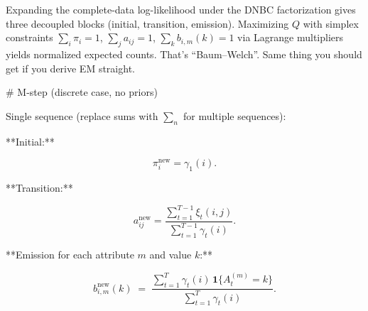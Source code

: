 Expanding the complete-data log-likelihood under the DNBC factorization gives three decoupled blocks (initial, transition, emission). Maximizing $Q$ with simplex constraints $\sum_i \pi_i=1$, $\sum_j a_{ij}=1$, $\sum_k b_{i,m}(k)=1$ via Lagrange multipliers yields normalized expected counts. That’s “Baum–Welch”. Same thing you should get if you derive EM straight.

# M-step (discrete case, no priors)

Single sequence (replace sums with $\sum_n$ for multiple sequences):

**Initial:**

$$
\pi_i^{\text{new}} = \gamma_1(i).
$$

**Transition:**

$$
a_{ij}^{\text{new}} = \frac{\sum_{t=1}^{T-1} \xi_t(i,j)}{\sum_{t=1}^{T-1} \gamma_t(i)}.
$$

**Emission for each attribute $m$ and value $k$:**

\[
b_{i,m}^{\text{new}}(k) \;=\; \frac{\sum_{t=1}^{T} \gamma_t(i)\,\mathbf{1}\{A_t^{(m)}=k\}}{\sum_{t=1}^{T} \gamma_t(i)}.
\]

